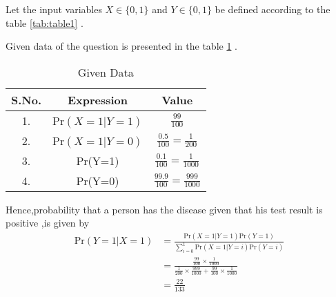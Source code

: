Let the input variables $X \in \{0,1\}$ and $Y \in \{0,1\}$ be defined according to the table \ref{tab:table1} .

\begin{table}[!ht]
\centering
{}
\caption{Input Variables}
\label{tab:table1}
\end{table}
Given data of the question is presented in the table \ref{tab:table2} .

\begin{table}[!ht]
\centering
\begin{tabular}{|c|c|c|} 
\hline
S.No. & Expression & Value \\
\hline 
1. &  Pr$(X=1|Y=1)$ & $\frac{99}{100}$ \\ 
\hline 
2. & Pr$(X=1|Y=0)$ & $\frac{0.5}{100} = \frac{1}{200}$ \\ 
\hline 
3. & Pr(Y=1) & $\frac{0.1}{100} = \frac{1}{1000}$ \\ 
\hline 
4. & Pr(Y=0) & $\frac{99.9}{100} = \frac{999}{1000}$ \\ 
\hline 
\end{tabular}
\caption{Given Data}
\label{tab:table2}
\end{table}
Hence,probability that a person has the disease given that his test result is positive ,is given by
\begin{align}
    \text{Pr}(Y=1|X=1) &= \frac{\text{Pr}(X=1|Y=1)\text{Pr}(Y=1)}{ \sum_{i=0}^{1}\text{Pr}(X=1|Y=i)\text{Pr}(Y=i)}
    \\
    &= \frac{\frac{99}{100} \times \frac{1}{1000}}{\frac{1}{200} \times \frac{999}{1000} + \frac{99}{100} \times \frac{1}{1000}}
    \\
    &= \frac{22}{133}
\end{align}